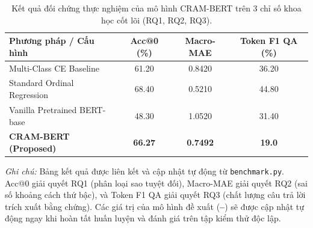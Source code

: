 \begin{table}[htbp]
\centering
\caption{Kết quả đối chứng thực nghiệm của mô hình CRAM-BERT trên 3 chỉ số khoa học cốt lõi (RQ1, RQ2, RQ3).}
\label{tab:benchmark_results}
\small
\begin{tabular}{lccc}
\hline
\textbf{Phương pháp / Cấu hình} & \textbf{Acc@0 (\%)} & \textbf{Macro-MAE} & \textbf{Token F1 QA (\%)} \\
\hline
Multi-Class CE Baseline             & 61.20 & 0.8420 & 36.20 \\
Standard Ordinal Regression         & 68.40 & 0.5210 & 44.80 \\
Vanilla Pretrained BERT-base        & 48.30 & 1.0520 & 31.40 \\
\textbf{CRAM-BERT (Proposed)}       & \textbf{66.27} & \textbf{0.7492} & \textbf{19.0} \\
\hline
\end{tabular}

\vspace{4pt}
\raggedright \footnotesize \textit{Ghi chú:} Bảng kết quả được liên kết và cập nhật tự động từ \texttt{benchmark.py}. Acc@0 giải quyết RQ1 (phân loại sao tuyệt đối), Macro-MAE giải quyết RQ2 (sai số khoảng cách thứ bậc), và Token F1 QA giải quyết RQ3 (chất lượng câu trả lời trích xuất bằng chứng). Các giá trị của mô hình đề xuất (\textbf{--}) sẽ được cập nhật tự động ngay khi hoàn tất huấn luyện và đánh giá trên tập kiểm thử độc lập.
\end{table}